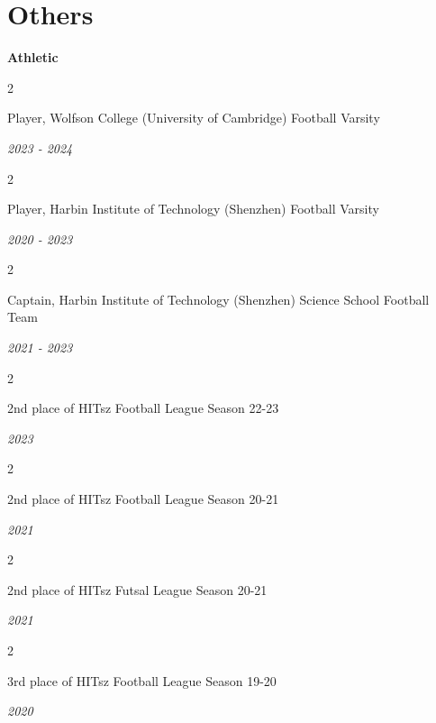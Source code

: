 \documentclass[10pt, letterpaper]{article}
\newenvironment{twocolentry}[2][]{
    \onecolentry
    \def\secondColumn{#2}
    \setcolumnwidth{\fill, 4.5 cm}
    \begin{paracol}{2}
}{
    \switchcolumn \raggedleft \secondColumn
    \end{paracol}
    \endonecolentry
} %
\begin{document}
\section{Others}
\textbf{Athletic}
\begin{twocolentry}
{\textit{2023 - 2024}}

{Player, Wolfson College (University of Cambridge) Football Varsity}
\end{twocolentry}
\begin{twocolentry}
{\textit{2020 - 2023}}

{Player, Harbin Institute of Technology (Shenzhen) Football Varsity}    
\end{twocolentry}

\begin{twocolentry}
{\textit{2021 - 2023}}

{Captain, Harbin Institute of Technology (Shenzhen) Science School Football Team}
\end{twocolentry}

\begin{twocolentry}
{\textit{2023}}

    2nd place of HITsz Football League Season 22-23
\end{twocolentry}
\begin{twocolentry}
{\textit{2021}}

    2nd place of HITsz Football League Season 20-21
\end{twocolentry}
\begin{twocolentry}
{\textit{2021}}

    2nd place of HITsz Futsal League Season 20-21
\end{twocolentry}
\begin{twocolentry}
    {\textit{2020}}
    
    3rd place of HITsz Football League Season 19-20
\end{twocolentry}



\end{document}
